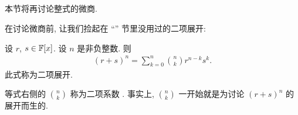 \subsection*{\DerivativesRevisited}
\markright{\DerivativesRevisited}

本节将再讨论整式的微商.

在讨论微商前, 让我们捡起在 ``\GeneralizedBinomialCoefficients '' 节里没用过的二项展开:

\begin{proposition}
    设 $r$, $s \in \mathbb{F}[x]$. 设 $n$ 是非负整数. 则
    \begin{align*}
        (r + s)^{n} = \sum_{k = 0}^{n} \binom{n}{k} r^{n - k} s^{k}.
    \end{align*}
    此式称为二项展开.
\end{proposition}

\begin{remark}
    等式右侧的 $\binom{n}{k}$ 称为二项系数 . 事实上, $\binom{n}{k}$ 一开始就是为讨论 $(r+s)^n$ 的展开而生的.
\end{remark}


